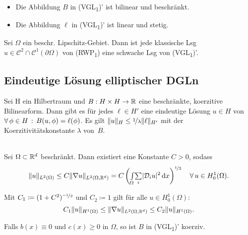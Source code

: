 \documentclass{cheat-sheet}
\newcommand{\Cont}{\mathcal{C}} %
\newcommand{\bOmega}{\partial \Omega} %
\newcommand{\IntOmega}[2]{\AInt{\Omega}{#1}{#2}} %
\newcommand{\tss}[1]{\textsubscript{#1}} %
\newcommand{\DO}{\mathcal{D}} %
\begin{document}
\begin{lem}
  \begin{itemize}
    \item Die Abbildung $B$ in (VGL\tss{1})' ist bilinear und beschränkt.
    \item Die Abbildung $\ell$ in (VGL\tss{1})' ist linear und stetig.
  \end{itemize}
\end{lem}

\begin{satz}
  Sei $\Omega$ ein beschr. Lipschitz-Gebiet.
  Dann ist jede klassische Lsg $u \in \Cont^2 \cap \Cont^1(\bOmega)$ von (RWP\tss{1}) eine schwache Lsg von (VGL\tss{1})'.
\end{satz}

\subsection{Eindeutige Lösung elliptischer DGLn}

\begin{satz}
  Sei H ein Hilbertraum und $B : H \times H \to \mathbb{R}$ eine beschränkte, koerzitive Bilinearform.
  Dann gibt es für jedes $\ell \in H'$ eine eindeutige Lösung $u \in H$ von  $\forall \, {\phi \in H} \,:\, B(u, \phi) = \ell(\phi)$.
  Es gilt $\lVert u\rVert_H \leq \nicefrac{1}{\lambda} \lVert\ell\rVert_{H'}$ mit der Koerzitivitätskonstante $\lambda$ von~$B$.
\end{satz}


\begin{lem} \mbox{} \\
  Sei $\Omega \subset \mathbb{R}^d$ beschränkt.
  Dann existiert eine Konstante $C > 0$, sodass
  \[
    \norm{u}_{L^2(\Omega)} \leq C \norm{\nabla u}_{L^2(\Omega, \R^d)} = C \left( \IntOmega{\sum_i \abs{\DO_i u}^2}{x} \right)^{\nicefrac{1}{2}} \quad
    \forall \, u \in H_0^1(\Omega).
  \]
\end{lem}

\begin{kor}
  Mit $C_1 \coloneqq (1 + C^2)^{\nicefrac{-1}{2}}$ und $C_2 \coloneqq 1$ gilt für alle $u \in H_0^1(\Omega)$:
  \[ C_1 \lVert u\rVert_{H^1(\Omega)} \leq \lVert\nabla u\rVert_{L^2(\Omega, \mathbb{R}^d)} \leq C_2 \lVert u\rVert_{H^1(\Omega)}. \]
\end{kor}

\begin{lem}
  Falls $b(x) \equiv 0$ und $c(x) \geq 0$ in $\Omega$, so ist $B$ in (VGL\tss{1})' koerziv.
\end{lem}
\end{document}
